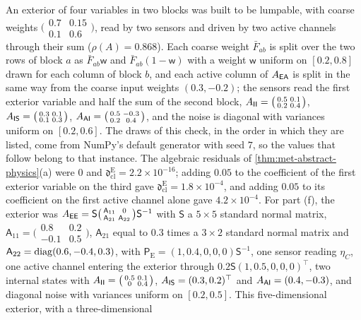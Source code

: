 \begin{numcheck}\label{chk:met-physics}
An exterior of four variables in two blocks was built to be lumpable, with coarse weights $\bigl(\begin{smallmatrix}0.7&0.15\\0.1&0.6\end{smallmatrix}\bigr)$, read by two sensors and driven by two active channels through their sum ($\rho(A)=0.868$). Each coarse weight $\bar F_{ab}$ is split over the two rows of block $a$ as $\bar F_{ab}\mathsf w$ and $\bar F_{ab}(1-\mathsf w)$ with a weight $\mathsf w$ uniform on $[0.2,0.8]$ drawn for each column of block $b$, and each active column of $A_{\mathsf{E}\mathsf{A}}$ is split in the same way from the coarse input weights $(0.3,-0.2)$; the sensors read the first exterior variable and half the sum of the second block, $A_{\mathsf{I}\mathsf{I}}=\bigl(\begin{smallmatrix}0.5&0.1\\0.2&0.4\end{smallmatrix}\bigr)$, $A_{\mathsf{I}\mathsf{S}}=\bigl(\begin{smallmatrix}0.3&0.1\\0.1&0.3\end{smallmatrix}\bigr)$, $A_{\mathsf{A}\mathsf{I}}=\bigl(\begin{smallmatrix}0.5&-0.3\\0.2&0.4\end{smallmatrix}\bigr)$, and the noise is diagonal with variances uniform on $[0.2,0.6]$. The draws of this check, in the order in which they are listed, come from NumPy's default generator with seed $7$, so the values that follow belong to that instance. The algebraic residuals of \cref{thm:met-abstract-physics}(a) were $0$ and $\mathfrak d^{\mathrm E}_{\mathrm{cl}}=2.2\times10^{-16}$; adding $0.05$ to the coefficient of the first exterior variable on the third gave $\mathfrak d^{\mathrm E}_{\mathrm{cl}}=1.8\times10^{-4}$, and adding $0.05$ to its coefficient on the first active channel alone gave $4.2\times10^{-4}$. For part (f), the exterior was $A_{\mathsf{E}\mathsf{E}}=\mathsf S\bigl(\begin{smallmatrix}\mathsf A_{11}&0\\\mathsf A_{21}&\mathsf A_{22}\end{smallmatrix}\bigr)\mathsf S^{-1}$ with $\mathsf S$ a $5\times5$ standard normal matrix, $\mathsf A_{11}=\bigl(\begin{smallmatrix}0.8&0.2\\-0.1&0.5\end{smallmatrix}\bigr)$, $\mathsf A_{21}$ equal to $0.3$ times a $3\times2$ standard normal matrix and $\mathsf A_{22}=\operatorname{diag}(0.6,-0.4,0.3)$, with $\mathsf P_{\mathrm E}=(1,0.4,0,0,0)\mathsf S^{-1}$, one sensor reading $\eta_C$, one active channel entering the exterior through $0.2\mathsf S(1,0.5,0,0,0)^\top$, two internal states with $A_{\mathsf{I}\mathsf{I}}=\bigl(\begin{smallmatrix}0.5&0.1\\0&0.4\end{smallmatrix}\bigr)$, $A_{\mathsf{I}\mathsf{S}}=(0.3,0.2)^\top$ and $A_{\mathsf{A}\mathsf{I}}=(0.4,-0.3)$, and diagonal noise with variances uniform on $[0.2,0.5]$. This five-dimensional exterior, with a three-dimensional 
\end{numcheck}
